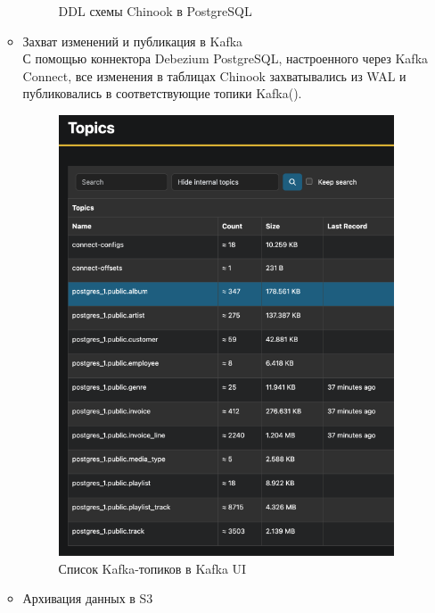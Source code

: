 \begin{enumerate}[1.]
\begin{itemize}
\begin{figure}[h]
                        \caption{DDL схемы Chinook в PostgreSQL}
                        \label{fig:ex2_schema_ddl}
                    \end{figure}
                    \FloatBarrier
              \item Захват изменений и публикация в Kafka \\
                    С помощью коннектора Debezium PostgreSQL, настроенного через Kafka Connect, все изменения в таблицах Chinook захватывались из WAL и публиковались в соответствующие топики Kafka().
                    \begin{figure}[h]
                        \center
                        \includegraphics [scale=0.5] {my_folder/images/ex2_kafka_topics}
                        \caption{Список Kafka-топиков в Kafka UI}
                        \label{fig:ex2_kafka_topics}
                    \end{figure}
                    \FloatBarrier
              \item Архивация данных в S3\\

\end{itemize}
\end{enumerate}
